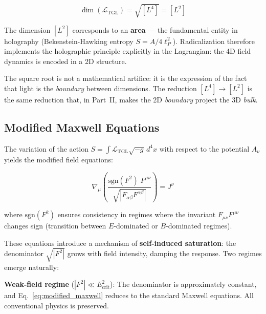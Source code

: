 \documentclass[12pt,a4paper,twoside]{article}
\newcommand{\Ltgl}{\mathcal{L}_{\text{TGL}}}
\newcommand{\Ecrit}{E_{\text{crit}}}
\newcommand{\boundary}{\textit{boundary}}
\newcommand{\bulk}{\textit{bulk}}
\begin{document}
\begin{equation}
\dim(\Ltgl) = \sqrt{[L^4]} = [L^2]
\label{eq:dimensional_reduction}
\end{equation}

\noindent The dimension $[L^2]$ corresponds to an \textbf{area} --- the fundamental entity in holography (Bekenstein-Hawking entropy $S = A/4\ell_P^2$). Radicalization therefore implements the holographic principle explicitly in the Lagrangian: the 4D field dynamics is encoded in a 2D structure.

\begin{resultbox}[title={Holographic Principle in the Lagrangian}]
The square root is not a mathematical artifice: it is the expression of the fact that light is the \textit{boundary} between dimensions. The reduction $[L^4] \to [L^2]$ is the same reduction that, in Part~II, makes the 2D \boundary{} project the 3D \bulk.
\end{resultbox}



\subsection{Modified Maxwell Equations}

The variation of the action $S = \int \Ltgl \sqrt{-g}\, d^4x$ with respect to the potential $A_\nu$ yields the modified field equations:

\begin{equationbox}[title={Modified Maxwell Equations}]
\begin{equation}
\nabla_\mu\left(\frac{\text{sgn}(F^2)\; F^{\mu\nu}}{\sqrt{|F_{\alpha\beta}F^{\alpha\beta}|}}\right) = J^\nu
\label{eq:modified_maxwell}
\end{equation}
\end{equationbox}

\noindent where $\text{sgn}(F^2)$ ensures consistency in regimes where the invariant $F_{\mu\nu}F^{\mu\nu}$ changes sign (transition between $E$-dominated or $B$-dominated regimes).



These equations introduce a mechanism of \textbf{self-induced saturation}: the denominator $\sqrt{|F^2|}$ grows with field intensity, damping the response. Two regimes emerge naturally:

\medskip
\noindent\textbf{Weak-field regime} ($|F^2| \ll \Ecrit^2$): The denominator is approximately constant, and Eq.~\eqref{eq:modified_maxwell} reduces to the standard Maxwell equations. All conventional physics is preserved.
\end{document}
